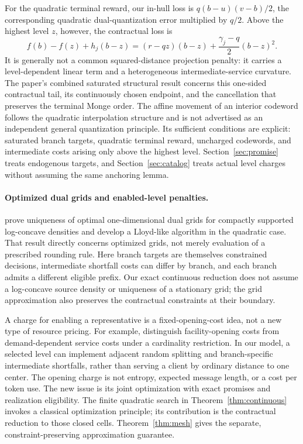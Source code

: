 For the quadratic terminal reward, our in-hull loss is $q(b-u)(v-b)/2$, the corresponding quadratic dual-quantization error multiplied by $q/2$. Above the highest level $z$, however, the contractual loss is
\[
 f(b)-f(z)+h_j(b-z)
 =(r-qz)(b-z)+\frac{\gamma_j-q}{2}(b-z)^2.
\]
It is generally not a common squared-distance projection penalty: it carries a level-dependent linear term and a heterogeneous intermediate-service curvature. The paper's combined saturated structural result concerns this one-sided contractual tail, its continuously chosen endpoint, and the cancellation that preserves the terminal Monge order. The affine movement of an interior codeword follows the quadratic interpolation structure and is not advertised as an independent general quantization principle. Its sufficient conditions are explicit: saturated branch targets, quadratic terminal reward, uncharged codewords, and intermediate costs arising only above the highest level. Section~\ref{sec:promise} treats endogenous targets, and Section~\ref{sec:catalog} treats actual level charges without assuming the same anchoring lemma.

\paragraph{Optimized dual grids and enabled-level penalties.}
\citet{JourdainPages2021} prove uniqueness of optimal one-dimensional dual grids for compactly supported log-concave densities and develop a Lloyd-like algorithm in the quadratic case. That result directly concerns optimized grids, not merely evaluation of a prescribed rounding rule. Here branch targets are themselves constrained decisions, intermediate shortfall costs can differ by branch, and each branch admits a different eligible prefix. Our exact continuous reduction does not assume a log-concave source density or uniqueness of a stationary grid; the grid approximation also preserves the contractual constraints at their boundary.

A charge for enabling a representative is a fixed-opening-cost idea, not a new type of resource pricing. For example, \citet{AardalEtAl2014} distinguish facility-opening costs from demand-dependent service costs under a cardinality restriction. In our model, a selected level can implement adjacent random splitting and branch-specific intermediate shortfalls, rather than serving a client by ordinary distance to one center. The opening charge is not entropy, expected message length, or a cost per token use. The new issue is its joint optimization with exact promises and realization eligibility. The finite quadratic search in Theorem~\ref{thm:continuous} invokes a classical optimization principle; its contribution is the contractual reduction to those closed cells. Theorem~\ref{thm:mesh} gives the separate, constraint-preserving approximation guarantee.

